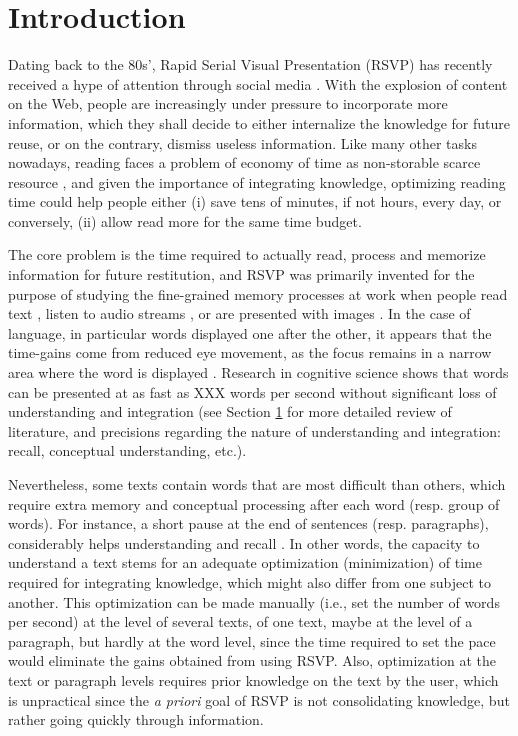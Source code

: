 \section{Introduction}
Dating back to the 80s', Rapid Serial Visual Presentation (RSVP) has recently received a hype of attention through social media \cite{slate2014}. With the explosion of content on the Web, people are increasingly under pressure to incorporate more information, which they shall decide to either internalize the knowledge for future reuse, or on the contrary, dismiss useless information. Like many other tasks nowadays, reading faces a problem of economy of time as non-storable scarce resource \cite{maillart2011}, and given the importance of integrating knowledge, optimizing reading time could help people either (i) save tens of minutes, if not hours, every day, or conversely, (ii) allow read more for the same time budget.

The core problem is the time required to actually read, process and memorize information for future restitution, and RSVP was primarily invented for the purpose of studying the fine-grained memory processes at work when people read text \cite{}, listen to audio streams \cite{}, or are presented with images \cite{}. In the case of language, in particular words displayed one after the other, it appears that the time-gains come from reduced eye movement, as the focus remains in a narrow area where the word is displayed \cite{}. Research in cognitive science shows that words can be presented at as fast as XXX words per second without significant loss of understanding and integration (see Section \ref{} for more detailed review of literature, and precisions regarding the nature of understanding and integration: recall, conceptual understanding, etc.). 

Nevertheless, some texts contain words that are most difficult than others, which require extra memory and conceptual processing after each word (resp. group of words). For instance, a short pause at the end of sentences (resp. paragraphs), considerably helps understanding and recall \cite{}. In other words, the capacity to understand a text stems for an adequate optimization (minimization) of time required for integrating knowledge, which might also differ from one subject to another. This optimization can be made manually (i.e., set the number of words per second) at the level of several texts, of one text, maybe at the level of a paragraph, but hardly at the word level, since the time required to set the pace would eliminate the gains obtained from using RSVP. Also, optimization at the text or paragraph levels requires prior knowledge on the text by the user, which is unpractical since the {\it a priori} goal of RSVP is not consolidating knowledge, but rather going quickly through information.
 
